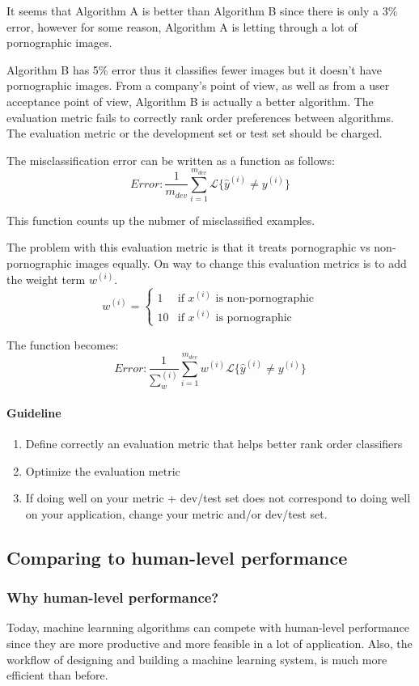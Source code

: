 \documentclass[UTF8]{article}
\newcommand{\Cal}[1]{\mathcal{#1}}                  %
\begin{document}
It seems that Algorithm A is better than Algorithm B since there is only a 3\% error, however for
some reason, Algorithm A is letting through a lot of pornographic images.

Algorithm B has 5\% error thus it classifies fewer images but it doesn't have pornographic images.
From a company's point of view, as well as from a user acceptance point of view, Algorithm B is
actually a better algorithm. The evaluation metric fails to correctly rank order preferences
between algorithms. The evaluation metric or the development set or test set should be charged.

The misclassification error can be written as a function as follows:
$$ Error: \frac{1}{m_{dev}}\sum_{i=1}^{m_{dev}} \Cal{L}\{\hat{y}^{(i)}\neq y^{(i)}\} $$

This function counts up the nubmer of misclassified examples.

The problem with this evaluation metric is that it treats pornographic vs non-pornographic images
equally. On way to change this evaluation metrics is to add the weight term $w^{(i)}$.
$$ w^{(i)} = \left\{\begin{array}{rl} 1 & \text{if } x^{(i)} \text{ is non-pornographic} \\
10 & \text{if } x^{(i)} \text{ is pornographic} \end{array}\right. $$

The function becomes:
$$ Error: \frac{1}{\sum_w^{(i)}} \sum_{i=1}^{m_{dev}} w^{(i)} \Cal{L}\{\hat{y}^{(i)} \neq y^{(i)}
\} $$

\paragraph{Guideline}
\begin{enumerate}
    \item Define correctly an evaluation metric that helps better rank order classifiers
    \item Optimize the evaluation metric
    \item If doing well on your metric + dev/test set does not correspond to doing well on your
    application, change your metric and/or dev/test set.
\end{enumerate}

\subsection{Comparing to human-level performance}
\subsubsection{Why human-level performance?}
Today, machine learnning algorithms can compete with human-level performance since they are more
productive and more feasible in a lot of application. Also, the workflow of designing and building
a machine learning system, is much more efficient than before.
\end{document}
